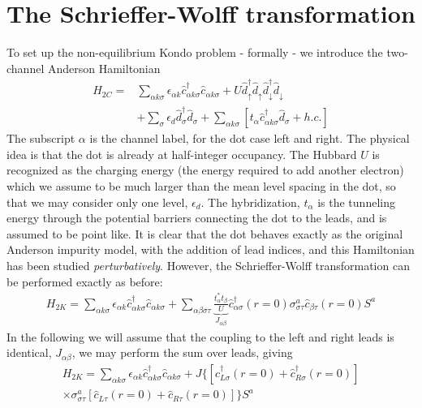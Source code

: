 \documentclass[twocolumn]{el-author}
\begin{document}
\section{The Schrieffer-Wolff transformation}
To set up the non-equilibrium Kondo problem - formally - we introduce the two-channel Anderson Hamiltonian
\begin{align}
  H_{2C}=&\sum_{\alpha k\sigma}\epsilon_{\alpha k}\hat{c}^{\dagger}_{\alpha k\sigma}\hat{c}_{\alpha
  k\sigma}+U\hat{d}^{\dagger}_{\uparrow}\hat{d}_{\uparrow}\hat{d}^{\dagger}_{\downarrow}\hat{d}_{\downarrow}\nonumber\\
  &+\sum_{\sigma}\epsilon_{d}\hat{d}^{\dagger}_{\sigma}\hat{d}_{\sigma}+\sum_{\alpha
  k\sigma}[t_{\alpha}\hat{c}^{\dagger}_{\alpha k\sigma}\hat{d}_{\sigma}+h.c.]
\end{align}
The subscript $\alpha$ is the channel label, for the dot case left and right.  The physical idea is that the dot is already at half-integer occupancy.  The Hubbard $U$ is recognized as the charging energy (the energy required to add another electron) which we assume to be much larger than the mean level spacing in the dot, so that we may consider only one level, $\epsilon_{d}$.  The hybridization, $t_{\alpha}$ is the tunneling energy through the potential barriers connecting the dot to the leads, and is assumed to be point like.  It is clear that the dot behaves exactly as the original Anderson impurity model, with the addition of lead indices, and this Hamiltonian has been studied \emph{perturbatively}.  However, the Schrieffer-Wolff transformation can be performed exactly as before:
\begin{align}
  H_{2K}=\sum_{\alpha k\sigma}\epsilon_{\alpha k}\hat{c}^{\dagger}_{\alpha k\sigma}\hat{c}_{\alpha
  k\sigma}+\sum_{\alpha\beta\sigma\tau}\underbrace{\frac{t^{*}_{\alpha}t_{\beta}}{U}}_{J_{\alpha\beta}}\hat{c}^{\dagger}_{\alpha\sigma}(r=0)\sigma^{a}_{\sigma\tau}\hat{c}_{\beta\tau}(r=0)S^{a}
\end{align}
In the following we will assume that the coupling to the left and right leads is identical, $J_{\alpha\beta}$,  we may perform the sum over leads, giving
\begin{align}\label{2lead}
  H_{2K}=\sum_{\alpha k\sigma}\epsilon_{\alpha k}\hat{c}^{\dagger}_{\alpha k\sigma}\hat{c}_{\alpha
  k\sigma}+J\{[\hat{c}_{L\sigma}^{\dagger}(r=0)+\hat{c}_{R\sigma}^{\dagger}(r=0)]\nonumber\\
  \times\sigma^{a}_{\sigma\tau}[\hat{c}_{L\tau}(r=0)+\hat{c}_{R\tau}(r=0)]\}S^{a}
\end{align}
\end{document}
